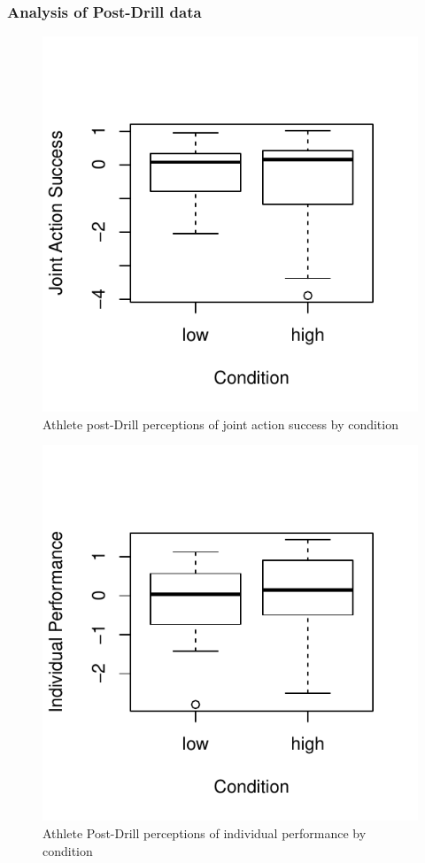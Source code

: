 \subsubsection{Analysis of Post-Drill data\label{app9:postExperimentData}}




   \begin{landscape}
     \centering
       
    \end{landscape}
 \restoregeometry



\begin{figure}
    \centering
    \includegraphics[width=0.5\linewidth,keepaspectratio] {images/groupJointActionSuccessPostBoxPlot-1}
    \caption{Athlete post-Drill perceptions of joint action success by condition}
              \label{fig:groupJointActionSuccessPostBoxPlot}
\end{figure}

\begin{figure}
  \centering
  \includegraphics[width=0.5\linewidth,keepaspectratio] {images/indComponentPerformancePostBoxPlot-1}
  \caption{Athlete Post-Drill perceptions of individual performance by condition}
    \label{fig:indComponentPerformancePostBoxPlot}
\end{figure}

